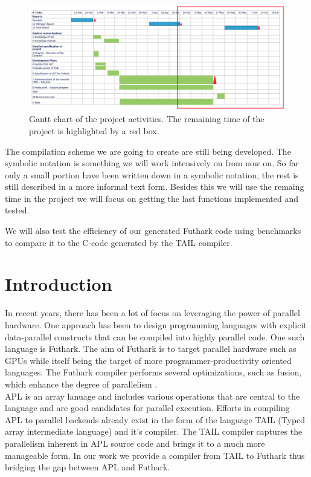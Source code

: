 \documentclass[11pt]{article}
\begin{document}
\begin{figure}[width=\textwidth]%
    \centering
    \includegraphics[width=\textwidth]{midvejsgantt3.png}
    \caption{Gantt chart of the project activities. The remaining time of the project is highlighted by a red box.}
    \label{fig:gantt}
\end{figure}

The compilation scheme we are going to create are still being developed. The symbolic notation is something we will work intensively on from now on. So far only a small portion have been written down in a symbolic notation, the rest is still described in a more informal text form. 
Besides this we will use the remaing time in the project we will focus on getting the last functions implemented and tested.

We will also test the efficiency of our generated Futhark code using benchmarks to compare it to the C-code generated by the TAIL compiler. 


\newpage

\section{Introduction}

In recent years, there has been a lot of focus on leveraging the power of parallel hardware. 
One approach has been to design programming languages with explicit data-parallel constructs that can be compiled 
into highly parallel code. One such language is Futhark. The aim of Futhark is to target parallel hardware such as 
GPUs while itself being the target of more programmer-productivity oriented languages. The Futhark compiler 
performs several optimizations, such as fusion, which enhance the degree of 
parallelism \cite{T.Henriksen&C.Oancea}.\\

APL is an array lanuage and includes various operations that are central to the language and are good candidates 
for parallel execution. Efforts in compiling APL to parallel backends already exist in the form of the language 
TAIL (Typed array intermediate language) and it’s compiler. The TAIL compiler captures the parallelism inherent in 
APL source code and brings it to a much more manageable form. In our work we provide a compiler from TAIL 
to Futhark thus bridging the gap between APL and Futhark.\\
\end{document}

